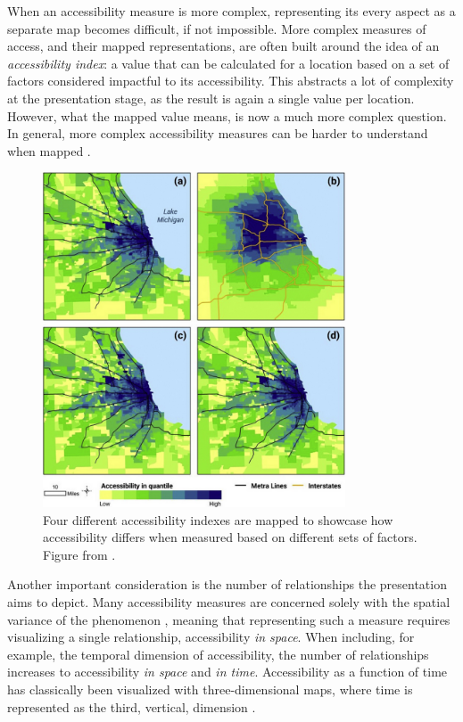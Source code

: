 When an accessibility measure is more complex,
representing its every aspect as a separate map becomes difficult,
if not impossible.
More complex measures of access, and their mapped representations,
are often built around the idea of
an \textit{accessibility index}:
a value that can be calculated for a location
based on a set of factors considered impactful to its accessibility.
This abstracts a lot of complexity at the presentation stage,
as the result is again a single value per location.  %
However, what the mapped value means, is now a much more complex question.
In general, more complex accessibility measures can be
harder to understand when mapped \parencite{te2014}.

\begin{figure}[H]
	\centering
	\includegraphics[width=0.8\textwidth]{visual/figures/screenshots/accessibility_index_comparison}
	\caption{
		Four different accessibility indexes are mapped to showcase how
		accessibility differs when measured based on
		different sets of factors.
		Figure from \textcite{kim2019}.
	}
	\label{fig:accessibility index}
\end{figure}


Another important consideration is
the number of relationships the presentation aims to depict.
Many accessibility measures are concerned solely with
the spatial variance of the phenomenon \parencite{wu2020},
meaning that representing such a measure requires
visualizing a single relationship,
accessibility \textit{in space}.
When including, for example, the temporal dimension of accessibility,
the number of relationships increases to
accessibility \textit{in space} and \textit{in time}.
Accessibility as a function of time
has classically been visualized with
three-dimensional maps, where
time is represented as the third, vertical, dimension
\parencite{hag1970, neu2011, kwa1998, hu2019}
.

